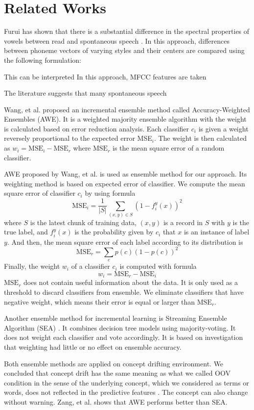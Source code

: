 \documentclass[conference]{IEEEtran}
\begin{document}
\section{Related Works}

Furui has shown that there is a substantial difference in the spectral properties of vowels between read and spontaneous speech \cite{furui1}.
In this approach, differences between phoneme vectors of varying styles and their centers are compared using the following formulation:

This can be interpreted
In this approach, MFCC features are taken

The literature suggests that many spontaneous speech 

Wang, et al. \cite{wang} proposed an incremental ensemble method called Accuracy-Weighted Ensembles (AWE).
It is a weighted majority ensemble algorithm with the weight is calculated based on error reduction analysis.
Each classifier $c_i$ is given a weight reversely proportional to the expected error MSE$_i$.
The weight is then calculated as $w_i = \text{MSE}_i - \text{MSE}_r$ where $\text{MSE}_r$ is the mean square error of a random classifier.

AWE proposed by Wang, et al. \cite{wang} is used as ensemble method for our approach.
Its weighting method is based on expected error of classifier.
We compute the mean square error of classifier $c_i$ by using formula
\[\text{MSE}_i = \frac{1}{|S|} \sum_{(x,y) \in S} (1 - f_i^y(x))^2\]
where $S$ is the latest chunk of training data, $(x,y)$ is a record in $S$ with $y$ is the true label, and $f_i^y(x)$ is the probability given by $c_i$ that $x$ is an instance of label $y$.
And then, the mean square error of each label according to its distribution is
\[\text{MSE}_r = \sum_{c} p(c)(1-p(c))^2\]
Finally, the weight $w_i$ of a classifier $c_i$ is computed with formula
\[w_i = \text{MSE}_r - \text{MSE}_i\]
$\text{MSE}_r$ does not contain useful information about the data.
It is only used as a threshold to discard classifiers from ensemble.
We eliminate classifiers that have negative weight, which means their error is equal or larger than $\text{MSE}_r$.

Another ensemble method for incremental learning is Streaming Ensemble Algorithm (SEA) \cite{street}.
It combines decision tree models using majority-voting.
It does not weight each classifier and vote accordingly.
It is based on investigation that weighting had little or no effect on ensemble accuracy.

Both ensemble methods are applied on concept drifting environment.
We concluded that concept drift has the same meaning as what we called OOV condition in the sense of the underlying concept, which we considered as terms or words, does not reflected in the predictive features \cite{street}.
The concept can also change without warning.
Zang, et al. \cite{zang} shows that AWE performs better than SEA.
\end{document}
